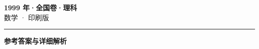 \documentclass[zihao=5, a4paper]{ctexart}
\begin{document}
\begin{center}
  {\Large\bfseries 1999 年·全国卷·理科}\\[4pt]
  {\large 数学 · 印刷版}
\end{center}
\medskip
{}

\par\bigskip\hrule\bigskip
{}
\begin{center}{\large\bfseries 参考答案与详细解析}\end{center}
\smallskip

\end{document}
